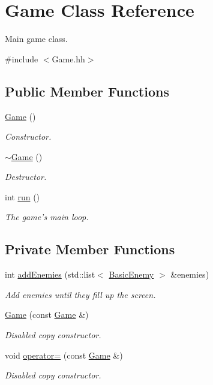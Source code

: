 \hypertarget{classGame}{\section{Game Class Reference}
\label{classGame}
}


Main game class.  




{\ttfamily \#include $<$Game.\-hh$>$}

\subsection*{Public Member Functions}
\begin{DoxyCompactItemize}
\item 
\hyperlink{classGame_ad59df6562a58a614fda24622d3715b65}{Game} ()
\begin{DoxyCompactList}\small\item\em Constructor. \end{DoxyCompactList}\item 
\hyperlink{classGame_ae3d112ca6e0e55150d2fdbc704474530}{$\sim$\-Game} ()
\begin{DoxyCompactList}\small\item\em Destructor. \end{DoxyCompactList}\item 
int \hyperlink{classGame_a99fb161fbbe87d25a8b73265a0611e58}{run} ()
\begin{DoxyCompactList}\small\item\em The game's main loop. \end{DoxyCompactList}\end{DoxyCompactItemize}
\subsection*{Private Member Functions}
\begin{DoxyCompactItemize}
\item 
int \hyperlink{classGame_aed445257fc658cf0d8be31c174c0e42e}{add\-Enemies} (std\-::list$<$ \hyperlink{classBasicEnemy}{Basic\-Enemy} $>$ \&enemies)
\begin{DoxyCompactList}\small\item\em Add enemies until they fill up the screen. \end{DoxyCompactList}\item 
\hyperlink{classGame_aa79443880de5f26387c2a1c70c8c1aae}{Game} (const \hyperlink{classGame}{Game} \&)
\begin{DoxyCompactList}\small\item\em Disabled copy constructor. \end{DoxyCompactList}\item 
void \hyperlink{classGame_a33d46168923cdeca0d97553fc47e050e}{operator=} (const \hyperlink{classGame}{Game} \&)
\begin{DoxyCompactList}\small\item\em Disabled copy constructor. \end{DoxyCompactList}\end{DoxyCompactItemize}
